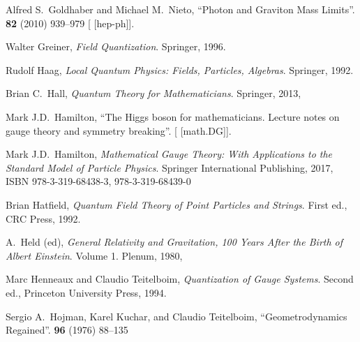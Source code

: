 \begin{thebibliography}{99}
Alfred S.~Goldhaber and Michael M.~Nieto,
``Photon and Graviton Mass Limits''.
 \textbf{82} (2010) 939--979
{\tt{}}
[ [hep-ph]].
\usesOurConventions

Walter Greiner,
\textit{Field Quantization}.
Springer, 1996.


Rudolf Haag,
\textit{Local Quantum Physics: Fields, Particles, Algebras}.
Springer, 1992.

Brian C.~Hall,
\textit{Quantum Theory for Mathematicians}.
Springer, 2013,
{\tt{}}

Mark J.D.\ Hamilton,
``The Higgs boson for mathematicians. Lecture notes on gauge theory and symmetry breaking''.
[ [math.DG]].

Mark J.D.\ Hamilton,
\textit{Mathematical Gauge Theory: With Applications to the Standard Model of Particle Physics}.
Springer International Publishing, 2017,
ISBN 978-3-319-68438-3, 978-3-319-68439-0
{\tt{}}

Brian Hatfield,
\textit{Quantum Field Theory of Point Particles and Strings}.
First ed., CRC Press, 1992.

A.~Held (ed),
\textit{General Relativity and Gravitation, 100 Years After the Birth of Albert Einstein}.
Volume 1.
Plenum, 1980,

Marc Henneaux and Claudio Teitelboim,
\textit{Quantization of Gauge Systems}.
Second ed., Princeton University Press, 1994.

Sergio A.~Hojman, Karel Kuchar, and Claudio Teitelboim,
``Geometrodynamics Regained''.
 \textbf{96} (1976) 88--135
{\tt{}}


\end{thebibliography}

